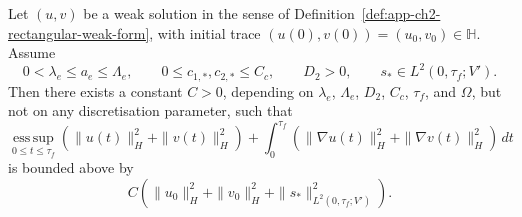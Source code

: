 \begin{theorem}
    \label{thm:app-ch2-rectangular-energy}
    Let \((u,v)\) be a weak solution in the sense of Definition~\ref{def:app-ch2-rectangular-weak-form}, with initial trace \((u(0),v(0))=(u_0,v_0)\in\mathbb{H}\). Assume
    \[
        0<\lambda_e\le a_e\le\Lambda_e,
        \qquad
        0\le c_{1,*},c_{2,*}\le C_c,
        \qquad
        D_2>0,
        \qquad
        s_*\in L^2(0,\tau_f;V').
    \]
    Then there exists a constant \(C>0\), depending on \(\lambda_e\), \(\Lambda_e\), \(D_2\), \(C_c\), \(\tau_f\), and \(\Omega\), but not on any discretisation parameter, such that
    \[
        \operatorname*{ess\,sup}_{0\le t\le\tau_f}
        \left(
        \|u(t)\|_H^2
        +
        \|v(t)\|_H^2
        \right)
        +
        \int_0^{\tau_f}
        \left(
        \|\nabla u(t)\|_H^2
        +
        \|\nabla v(t)\|_H^2
        \right)\,dt
    \]
    is bounded above by
    \[
        C
        \left(
        \|u_0\|_H^2
        +
        \|v_0\|_H^2
        +
        \|s_*\|_{L^2(0,\tau_f;V')}^2
        \right).
    \]
\end{theorem}
